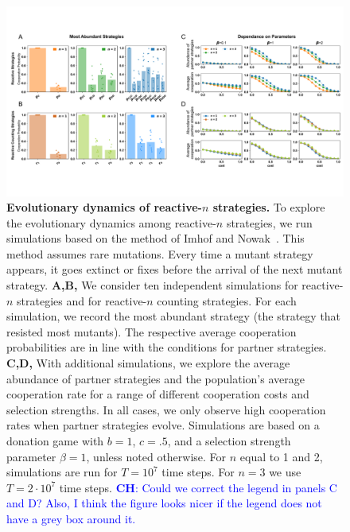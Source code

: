\documentclass[11pt]{article}
\newcommand{\christian}[1]{\textcolor{blue}{\textbf{CH}: #1}}
\begin{document}
\begin{figure}[t]
  \centering
  \includegraphics[width=\textwidth]{figures/abundant_strategies.pdf}
  \caption{\textbf{Evolutionary dynamics of reactive-$n$ strategies.}
  To explore the evolutionary dynamics among reactive-$n$ strategies, we run simulations based on the
  method of Imhof and Nowak~\cite{imhof:royal:2010}. 
  This method assumes rare mutations. 
  Every time a mutant strategy appears, it goes extinct or fixes before the arrival of the next mutant strategy. 
  {\bf A,B,} We consider ten independent simulations for reactive-$n$ strategies and for reactive-$n$ counting strategies. 
  For each simulation, we record the most abundant strategy (the strategy that resisted most mutants). 
  The respective average cooperation probabilities are in line with the conditions for partner strategies. 
  {\bf C,D,} With additional simulations, we explore the average abundance of partner strategies and the population's average cooperation rate for a range of different cooperation costs and selection strengths. 
  In all cases, we only observe high cooperation rates when partner strategies evolve. 
 Simulations are based on a donation game with \(b\!=\!1\),  \(c\!=\!.5\), and a selection strength parameter $\beta\!=\!1$, unless noted otherwise.     For $n$ equal to 1
  and 2, simulations are run for \(T\!=\! 10 ^ 7\) time steps. For $n\!=\!3$ we use \(T\!=\! 2 \!\cdot\!10 ^ 7\) time steps.
  \christian{Could we correct the legend in panels C and D? Also, I think the figure looks nicer if the legend does not have a grey box around it.}}\label{fig:evolutionary_results}
\end{figure}
\end{document}
